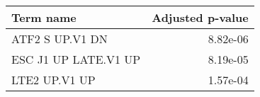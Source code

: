 \begin{tabular}{lr}
\toprule
           Term name &  Adjusted p-value \\
\midrule
     ATF2 S UP.V1 DN &          8.82e-06 \\
ESC J1 UP LATE.V1 UP &          8.19e-05 \\
       LTE2 UP.V1 UP &          1.57e-04 \\
\bottomrule
\end{tabular}
